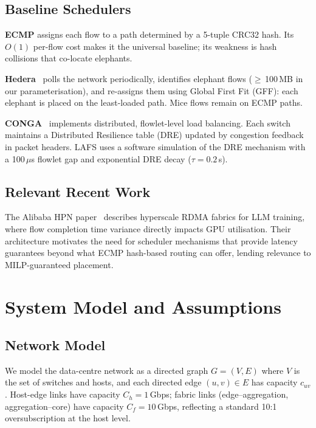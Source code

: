 \documentclass[runningheads]{llncs}
\begin{document}
\subsection{Baseline Schedulers}

\textbf{ECMP} assigns each flow to a path determined by a 5-tuple CRC32 hash. Its $O(1)$ per-flow cost makes it the universal baseline; its weakness is hash collisions that co-locate elephants.

\textbf{Hedera}~\cite{hedera} polls the network periodically, identifies elephant flows ($\geq$\,100\,MB in our parameterisation), and re-assigns them using Global First Fit (GFF): each elephant is placed on the least-loaded path. Mice flows remain on ECMP paths.

\textbf{CONGA}~\cite{conga} implements distributed, flowlet-level load balancing. Each switch maintains a Distributed Resilience table (DRE) updated by congestion feedback in packet headers. LAFS uses a software simulation of the DRE mechanism with a 100\,$\mu$s flowlet gap and exponential DRE decay ($\tau = 0.2$\,s).

\subsection{Relevant Recent Work}

The Alibaba HPN paper~\cite{alibabahpn} describes hyperscale RDMA fabrics for LLM training, where flow completion time variance directly impacts GPU utilisation. Their architecture motivates the need for scheduler mechanisms that provide latency guarantees beyond what ECMP hash-based routing can offer, lending relevance to MILP-guaranteed placement.

\section{System Model and Assumptions}
\label{sec:model}

\subsection{Network Model}

We model the data-centre network as a directed graph $G = (V, E)$ where $V$ is the set of switches and hosts, and each directed edge $(u,v) \in E$ has capacity $c_{uv}$. Host-edge links have capacity $C_h = 1$\,Gbps; fabric links (edge--aggregation, aggregation--core) have capacity $C_f = 10$\,Gbps, reflecting a standard 10:1 oversubscription at the host level.
\end{document}
